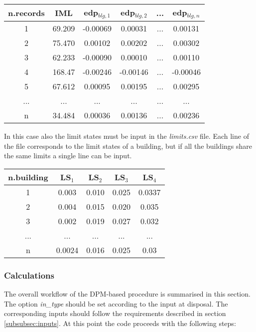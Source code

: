 \begin{table}[H]
\centering
\begin{tabular}{|c|c|c|c|c|c|} \hline
\textbf{n.records} & \textbf{IML} & \textbf{edp$_{blg,1}$} & \textbf{edp$_{blg,2}$} & \textbf{...} & \textbf{edp$_{blg,n}$} \\ \hline
1 &	69.209 &	-0.00069 &	0.00031 & ... &	0.00131\\ \hline
2 &	75.470 &	0.00102 & 	0.00202 & ... &	0.00302\\ \hline
3 &	62.233 &	-0.00090 &	0.00010 & ... &	0.00110\\ \hline
4 &	168.47 &	-0.00246 &	-0.00146 & ... &	-0.00046\\ \hline
5 &	67.612 &	0.00095 & 	0.00195 & ... &	0.00295\\ \hline
... & ... & ... & ... & ... & ...\\ \hline
n &	34.484 &	0.00036 & 	0.00136 & ... & 	0.00236\\ \hline
\end{tabular}
\end{table}

In this case also the limit states must be input in the \textit{limits.csv} file. Each line of the file corresponds to the limit states of a building, but if all the buildings share the same limits a single line can be input.

\begin{table}[H]
\centering
\begin{tabular}{|c|c|c|c|c|} \hline
\textbf{n.building} & \textbf{LS$_1$} & \textbf{LS$_2$} & \textbf{LS$_3$} & \textbf{LS$_4$} \\ \hline
1 & 0.003 &	0.010 &	0.025 &	0.0337\\ \hline
2 & 0.004 &	0.015 &	0.020 &	0.035\\ \hline
3 & 0.002 &	0.019 &	0.027 &	0.032\\ \hline
... & ... & ... & ... & ...\\ \hline
n & 0.0024 &	0.016 &	0.025 &	0.03\\ \hline
\end{tabular}
\end{table}

\subsubsection{Calculations}
The overall workflow of the DPM-based procedure is summarised in this section. The option \textit{in\_type} should be set according to the input at disposal. The corresponding inputs should follow the requirements described in section \ref{subsubsec:inputs}. At this point the code proceeds with the following steps:

